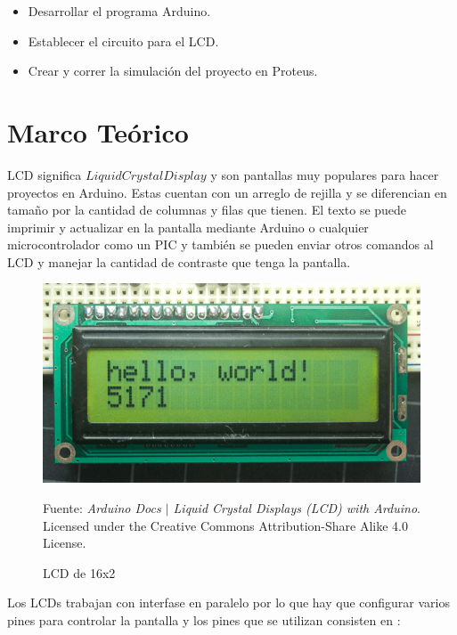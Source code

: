 \documentclass{article}
\begin{document}
    \begin{itemize}
        \item Desarrollar el programa Arduino.
        \item Establecer el circuito para el LCD.
        \item Crear y correr la simulación del proyecto en Proteus.
    \end{itemize}

    \section{Marco Teórico}

    LCD significa $Liquid Crystal Display$ y son pantallas muy populares para
    hacer proyectos en Arduino. Estas cuentan con un arreglo de rejilla y se
    diferencian en tamaño por la cantidad de columnas y filas que tienen. El
    texto se puede imprimir y actualizar en la pantalla mediante Arduino o
    cualquier microcontrolador como un PIC y también se pueden enviar otros
    comandos al LCD y manejar la cantidad de contraste que tenga la pantalla.

    \begin{figure}[H]
        \centering
        \includegraphics[width=0.3\paperwidth]{images/lcd-photo.png}
        \caption{LCD de 16x2}\footnotesize
        Fuente: \textit{Arduino Docs $\mid$ Liquid Crystal Displays (LCD)
            with Arduino}. Licensed under the Creative Commons
        Attribution-Share Alike 4.0 License. \cite{arduino-docs-lcd-2021}
    \end{figure}

    Los LCDs trabajan con interfase en paralelo por lo que hay que configurar
    varios pines para controlar la pantalla y los pines que se utilizan
    consisten en \cite{arduino-docs-lcd-2021}:
\end{document}
